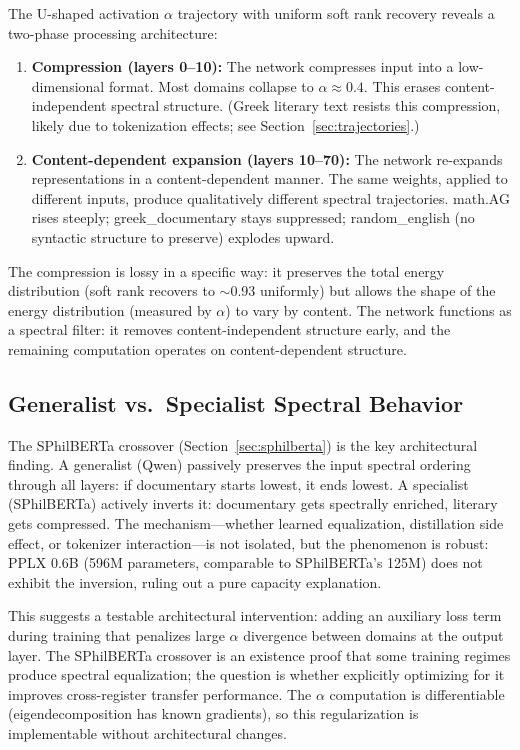\documentclass[12pt,letterpaper]{article}
\newcommand{\al}{\alpha}
\begin{document}
The U-shaped activation $\al$ trajectory with uniform soft rank
recovery reveals a two-phase processing architecture:

\begin{enumerate}
\item \textbf{Compression (layers 0--10):} The network compresses
input into a low-dimensional format.  Most domains collapse to
$\al \approx 0.4$.  This erases content-independent spectral
structure.  (Greek literary text resists this compression, likely
due to tokenization effects; see Section~\ref{sec:trajectories}.)

\item \textbf{Content-dependent expansion (layers 10--70):} The
network re-expands representations in a content-dependent manner.
The same weights, applied to different inputs, produce qualitatively
different spectral trajectories.  math.AG rises steeply;
greek\_documentary stays suppressed; random\_english (no syntactic
structure to preserve) explodes upward.
\end{enumerate}

The compression is lossy in a specific way: it preserves the total
energy distribution (soft rank recovers to $\sim$0.93 uniformly)
but allows the shape of the energy distribution (measured by $\al$)
to vary by content.  The network functions as a spectral filter:
it removes content-independent structure early, and the remaining
computation operates on content-dependent structure.

\subsection{Generalist vs.\ Specialist Spectral Behavior}

The SPhilBERTa crossover (Section~\ref{sec:sphilberta}) is the key
architectural finding.  A generalist (Qwen) passively preserves the
input spectral ordering through all layers: if documentary starts
lowest, it ends lowest.  A specialist (SPhilBERTa) actively inverts
it: documentary gets spectrally enriched, literary gets compressed.
The mechanism---whether learned equalization, distillation side
effect, or tokenizer interaction---is not isolated, but the
phenomenon is robust: PPLX 0.6B (596M parameters, comparable to
SPhilBERTa's 125M) does not exhibit the inversion, ruling out a
pure capacity explanation.

This suggests a testable architectural intervention: adding an
auxiliary loss term during training that penalizes large $\al$
divergence between domains at the output layer.  The SPhilBERTa
crossover is an existence proof that some training regimes produce
spectral equalization; the question is whether explicitly
optimizing for it improves cross-register transfer performance.
The $\al$ computation is differentiable (eigendecomposition has
known gradients), so this regularization is implementable without
architectural changes.
\end{document}
